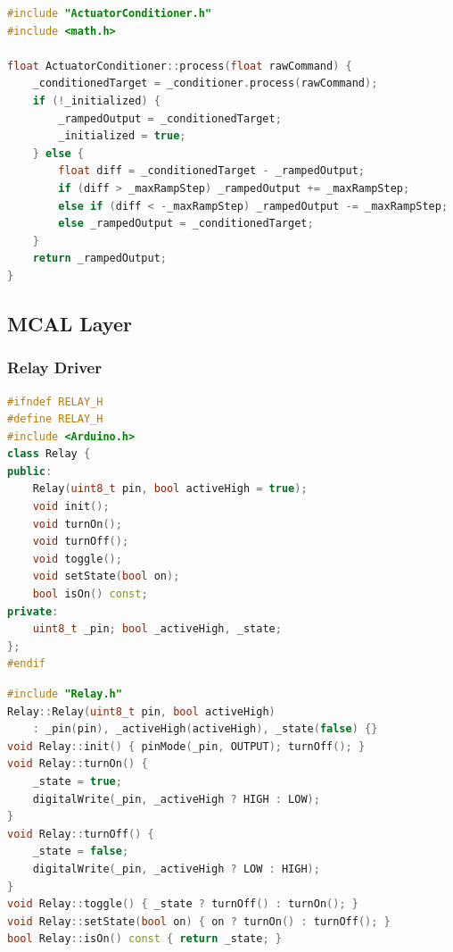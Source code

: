 \begin{lstlisting}[language=C++, caption=ActuatorConditioner.cpp --- Conditioning with ramping, label=lst:act_cond_cpp_app]
#include "ActuatorConditioner.h"
#include <math.h>

float ActuatorConditioner::process(float rawCommand) {
    _conditionedTarget = _conditioner.process(rawCommand);
    if (!_initialized) {
        _rampedOutput = _conditionedTarget;
        _initialized = true;
    } else {
        float diff = _conditionedTarget - _rampedOutput;
        if (diff > _maxRampStep) _rampedOutput += _maxRampStep;
        else if (diff < -_maxRampStep) _rampedOutput -= _maxRampStep;
        else _rampedOutput = _conditionedTarget;
    }
    return _rampedOutput;
}
\end{lstlisting}

\subsection{MCAL Layer}

\subsubsection{Relay Driver}

\begin{lstlisting}[language=C++, caption=Relay.h --- Relay driver interface, label=lst:relay_h_app]
#ifndef RELAY_H
#define RELAY_H
#include <Arduino.h>
class Relay {
public:
    Relay(uint8_t pin, bool activeHigh = true);
    void init();
    void turnOn();
    void turnOff();
    void toggle();
    void setState(bool on);
    bool isOn() const;
private:
    uint8_t _pin; bool _activeHigh, _state;
};
#endif
\end{lstlisting}

\begin{lstlisting}[language=C++, caption=Relay.cpp --- Relay driver implementation, label=lst:relay_cpp_app]
#include "Relay.h"
Relay::Relay(uint8_t pin, bool activeHigh)
    : _pin(pin), _activeHigh(activeHigh), _state(false) {}
void Relay::init() { pinMode(_pin, OUTPUT); turnOff(); }
void Relay::turnOn() {
    _state = true;
    digitalWrite(_pin, _activeHigh ? HIGH : LOW);
}
void Relay::turnOff() {
    _state = false;
    digitalWrite(_pin, _activeHigh ? LOW : HIGH);
}
void Relay::toggle() { _state ? turnOff() : turnOn(); }
void Relay::setState(bool on) { on ? turnOn() : turnOff(); }
bool Relay::isOn() const { return _state; }
\end{lstlisting}


